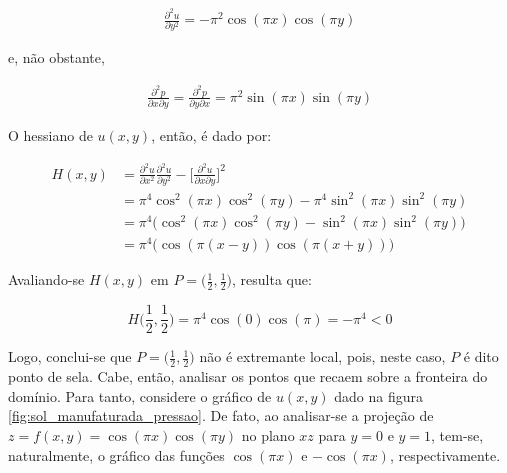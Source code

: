 \begin{equation}
	\begin{aligned}
		\frac{\partial^{2} u}{\partial y^{2}}= -\pi^{2}\cos(\pi x)\cos(\pi y) 
	\end{aligned}
\end{equation}

e, não obstante, 

\begin{equation}
	\begin{aligned}
		\frac{\partial^{2} p}{\partial x \partial y}=  \frac{\partial^{2} p}{\partial y \partial x} = \pi^{2}\sin(\pi x) \sin(\pi y)
	\end{aligned}
\end{equation}


O hessiano de $ u(x,y) $, então, é dado por:

\begin{equation}
	\begin{aligned}
		H(x,y) &= 	\frac{\partial^{2} u}{\partial x^{2}}\frac{\partial^{2} u}{\partial y^{2}} - \bigg[\frac{\partial^{2} u}{\partial x \partial y}\bigg]^{2} \\
		&= \pi^{4}\cos^{2}(\pi x)\cos^{2}(\pi y) - \pi^{4}\sin^{2}(\pi x) \sin^{2}(\pi y) \\
		&= \pi^{4}\big(\cos^{2}(\pi x)\cos^{2}(\pi y) - \sin^{2}(\pi x) \sin^{2}(\pi y)\big) \\
		&= \pi^{4}\big( \cos(\pi(x-y)) \cos(\pi(x+y)) \big)
	\end{aligned}
\end{equation}


Avaliando-se $ H(x,y) $ em $ P = \big(\frac{1}{2},\frac{1}{2}\big) $, resulta que:

\begin{equation}
	H\bigg(\frac{1}{2},\frac{1}{2}\bigg) = \pi^{4} \cos(0)\cos(\pi) = -\pi^{4} < 0
\end{equation}

Logo, conclui-se que $ P = \big(\frac{1}{2},\frac{1}{2}\big)  $ não é extremante local, pois, neste caso, $ P $ é dito ponto de sela. Cabe, então, analisar os pontos que recaem sobre a fronteira do domínio. Para tanto, considere o gráfico de $ u(x,y) $ dado na figura \ref{fig:sol_manufaturada_pressao}. De fato, ao analisar-se a projeção de $ z = f(x,y) =  \cos(\pi x) \cos(\pi y)$ no plano $ xz $ para $ y = 0 $ e $ y = 1 $, tem-se, naturalmente, o gráfico das funções $ \cos(\pi x) $ e $-\cos(\pi x)$, respectivamente.


